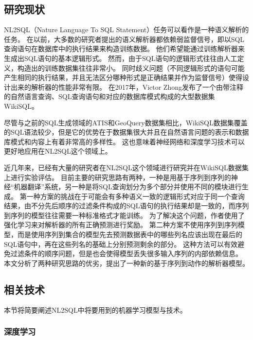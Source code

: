 \subsection{研究现状}
NL2SQL（Nature Language To SQL Statement）任务可以看作是一种语义解析的任务。
在以前，大多数的研究者提出的语义解析器都依赖弱监督信号，即以SQL查询语句在数据库中的执行结果来构造训练数据\cite{goldman2017weakly}。
他们希望能通过训练解析器来生成出SQL语句的基本逻辑形式。
然而，由于SQL语句的逻辑形式往往由人工定义，构造出的训练数据集往往非常小。
同时歧义问题（不同逻辑形式的语句可能产生相同的执行结果，并且无法区分哪种形式是正确结果并作为监督信号）使得设计出来的解析器的性能非常有限。
在2017年，Victor Zhong\cite{zhong2017seq2sql}发布了一个由带注释的自然语言查询、SQL查询语句和对应的数据库模式构成的大型数据集WikiSQL。

尽管与之前的SQL生成领域的ATIS和GeoQuery数据集相比，WikiSQL数据集覆盖的SQL语法较少，但是它的优势在于数据集很大并且在自然语言问题的表示和数据库模式和内容上有着非常高的多样性。
这也意味着神经网络和深度学习技术可以更好地应用在NL2SQL这个领域上。

近几年来，已经有大量的研究者\cite{zhong2017seq2sql,dong2016language,xu2017sqlnet,yu2018typesql,wang2018pointing,huang2018natural,wang2018execution}在NL2SQL这个领域进行研究并在WikiSQL数据集上进行实验评估。
目前主要的研究思路有两种，一种是用基于序列到序列的神经“机器翻译”系统\cite{zhong2017seq2sql,dong2016language}，另一种是将SQL查询划分为多个部分并使用不同的模块进行生成\cite{xu2017sqlnet,yu2018typesql}。
第一种方案的挑战在于可能会有多种语义一致的逻辑形式对应于同一个查询结果，由不分先后顺序的过滤条件构成的SQL语句的执行结果却是一致的，而序列到序列的模型往往需要一种标准格式才能训练\cite{zhong2017seq2sql}。
为了解决这个问题，作者使用了强化学习来对解析器的所有正确预测进行奖励。
第二种方案不使用序列到序列模型，而是使用序列到集合的模型先去预测数据表中的哪些列名应该出现在最后的SQL语句中，再在这些列名的基础上分别预测剩余的部分。
这种方法可以有效避免过滤条件的顺序问题，但是也会使得模型丢失很多输入序列的内部依赖信息。
本文分析了两种研究思路的优劣，提出了一种新的基于序列到动作的解析器模型。

\subsection{相关技术}
本节将简要阐述NL2SQL中将要用到的机器学习模型与技术。
\subsubsection{深度学习}

